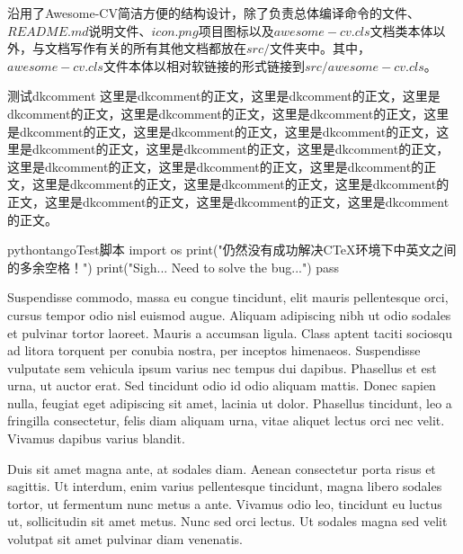 \makelettertitle

\begin{cvletter}

\dk 沿用了Awesome-CV简洁方便的结构设计，除了负责总体编译命令的文件、$README.md$说明文件、$icon.png$项目图标以及$awesome-cv.cls$文档类本体以外，与文档写作有关的所有其他文档都放在$src/$文件夹中。其中，$awesome-cv.cls$文件本体以相对软链接的形式链接到$src/awesome-cv.cls$。

\begin{dkcomment}{测试dkcomment}{\faTree}
这里是dkcomment的正文，这里是dkcomment的正文，这里是dkcomment的正文，这里是dkcomment的正文，这里是dkcomment的正文，这里是dkcomment的正文，这里是dkcomment的正文，这里是dkcomment的正文，这里是dkcomment的正文，这里是dkcomment的正文，这里是dkcomment的正文，这里是dkcomment的正文，这里是dkcomment的正文，这里是dkcomment的正文，这里是dkcomment的正文，这里是dkcomment的正文，这里是dkcomment的正文，这里是dkcomment的正文，这里是dkcomment的正文，这里是dkcomment的正文。
\end{dkcomment}

\begin{dkcodeh}{python}{tango}{Test脚本}
import os
print("仍然没有成功解决CTeX环境下中英文之间的多余空格！")
print("Sigh... Need to solve the bug...")
pass
\end{dkcodeh}


Suspendisse commodo, massa eu congue tincidunt, elit mauris pellentesque orci, cursus tempor odio nisl euismod augue. Aliquam adipiscing nibh ut odio sodales et pulvinar tortor laoreet. Mauris a accumsan ligula. Class aptent taciti sociosqu ad litora torquent per conubia nostra, per inceptos himenaeos. Suspendisse vulputate sem vehicula ipsum varius nec tempus dui dapibus. Phasellus et est urna, ut auctor erat. Sed tincidunt odio id odio aliquam mattis. Donec sapien nulla, feugiat eget adipiscing sit amet, lacinia ut dolor. Phasellus tincidunt, leo a fringilla consectetur, felis diam aliquam urna, vitae aliquet lectus orci nec velit. Vivamus dapibus varius blandit.

Duis sit amet magna ante, at sodales diam. Aenean consectetur porta risus et sagittis. Ut interdum, enim varius pellentesque tincidunt, magna libero sodales tortor, ut fermentum nunc metus a ante. Vivamus odio leo, tincidunt eu luctus ut, sollicitudin sit amet metus. Nunc sed orci lectus. Ut sodales magna sed velit volutpat sit amet pulvinar diam venenatis.

\end{cvletter}



\clearpage

